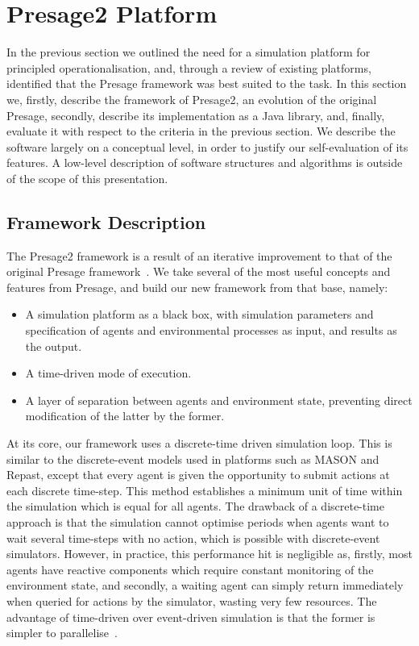 \section{Presage2 Platform}

In the previous section we outlined the need for a simulation platform for
principled operationalisation, and, through a review of existing platforms,
identified that the Presage framework was best suited to the task. In this
section we, firstly, describe the framework of Presage2, an evolution of the
original Presage, secondly, describe its implementation as a Java library,
and, finally, evaluate it with respect to the criteria in the previous
section. We describe the software largely on a conceptual level, in order to
justify our self-evaluation of its features. A low-level description of
software structures and algorithms is outside of the scope of this
presentation.

\subsection{Framework Description}

The Presage2 framework is a result of an iterative improvement to that of the
original Presage framework~\citep{Neville:2009}. 
We take several of the most useful concepts and features from Presage, and build our new framework from that base, namely:

\begin{itemize}
\item A simulation platform as a black box, with simulation parameters and specification of agents and environmental processes as input, and results as the output.
\item A time-driven mode of execution.
\item A layer of separation between agents and environment state, preventing direct modification of the latter by the former.
\end{itemize}

At its core, our framework uses a discrete-time driven simulation loop. This
is similar to the discrete-event models used in platforms such as MASON and
Repast, except that every agent is given the opportunity to submit actions at
each discrete time-step. This method establishes a minimum unit of time within
the simulation which is equal for all agents. The drawback of a discrete-time
approach is that the simulation cannot optimise periods when agents want to
wait several time-steps with no action, which is possible with discrete-event
simulators. However, in practice, this performance hit is negligible as,
firstly, most agents have reactive components which require constant
monitoring of the environment state, and secondly, a waiting agent can simply
return immediately when queried for actions by the simulator, wasting very
few resources. The advantage of time-driven over event-driven simulation is
that the former is simpler to parallelise~\citep{Ferscha1995}.

